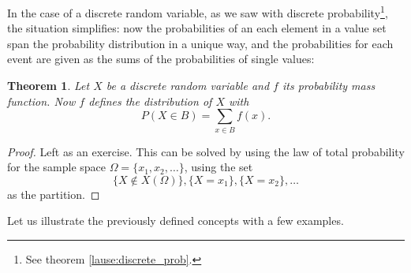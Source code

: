 \documentclass[12pt,a4paper,leqno]{report}
\theoremstyle{plain}
\newtheorem{lause}[equation]{Theorem}
\theoremstyle{definition}
\begin{document}
In the case of a discrete random variable, as we saw with discrete probability\footnote{See theorem \ref{lause:discrete_prob}.}, the situation simplifies: now the probabilities of an each element in a value set span the probability distribution in a unique way, and the probabilities for each event are given as the sums of the probabilities of single values:
    
\begin{lause}
Let $X$ be a discrete random variable and $f$ its probability mass function. Now $f$ defines the distribution of $X$ with
\[
P(X \in B) = \sum_{x \in B} f(x).
\]
\end{lause}

\begin{proof} Left as an exercise. This can be solved by using the law of total probability for the sample space $\Omega = \{x_1, x_2, \dots\}$, using the set 
\[
\{X \notin X(\Omega)\}, \{X = x_1\}, \{X = x_2\}, \dots
\]
as the partition.
\end{proof}

Let us illustrate the previously defined concepts with a few examples.
\end{document}
